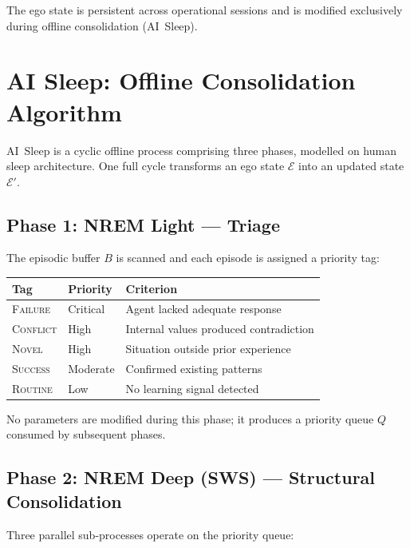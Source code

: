 \documentclass[11pt,a4paper]{article}
\begin{document}
The ego state is persistent across operational sessions and is modified
exclusively during offline consolidation (AI~Sleep).

\section{AI Sleep: Offline Consolidation Algorithm}
\label{sec:sleep}

AI~Sleep is a cyclic offline process comprising three phases, modelled on
human sleep architecture.  One full cycle transforms an ego state
$\mathcal{E}$ into an updated state $\mathcal{E}'$.

\subsection{Phase 1: NREM Light --- Triage}
\label{sec:sleep-triage}

The episodic buffer $B$ is scanned and each episode is assigned a
priority tag:

\begin{center}
\begin{tabular}{lll}
  \toprule
  \textbf{Tag} & \textbf{Priority} & \textbf{Criterion} \\
  \midrule
  \textsc{Failure}  & Critical & Agent lacked adequate response \\
  \textsc{Conflict} & High     & Internal values produced contradiction \\
  \textsc{Novel}    & High     & Situation outside prior experience \\
  \textsc{Success}  & Moderate & Confirmed existing patterns \\
  \textsc{Routine}  & Low      & No learning signal detected \\
  \bottomrule
\end{tabular}
\end{center}

No parameters are modified during this phase; it produces a priority
queue $Q$ consumed by subsequent phases.

\subsection{Phase 2: NREM Deep (SWS) --- Structural Consolidation}
\label{sec:sleep-sws}

Three parallel sub-processes operate on the priority queue:
\end{document}
